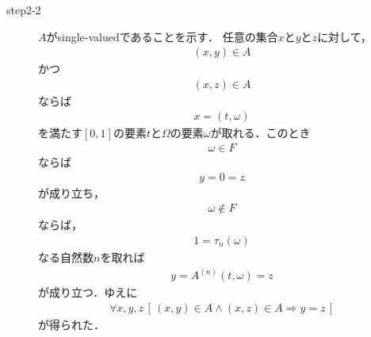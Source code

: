 \begin{sketch}
\begin{description}
			\item[step2-2]
				$A$がsingle-valuedであることを示す．
				任意の集合$x$と$y$と$z$に対して，
				\begin{align}
					(x,y) \in A
				\end{align}
				かつ
				\begin{align}
					(x,z) \in A
				\end{align}
				ならば
				\begin{align}
					x = (t,\omega)
				\end{align}
				を満たす$[0,1]$の要素$t$と$\Omega$の要素$\omega$が取れる．このとき
				\begin{align}
					\omega \in F
				\end{align}
				ならば
				\begin{align}
					y = 0 = z
				\end{align}
				が成り立ち，
				\begin{align}
					\omega \notin F
				\end{align}
				ならば，
				\begin{align}
					1 = \tau_{n}(\omega)
				\end{align}
				なる自然数$n$を取れば
				\begin{align}
					y = A^{(n)}(t,\omega) = z
				\end{align}
				が成り立つ．ゆえに
				\begin{align}
					\forall x,y,z\, \left[\, 
					(x,y) \in A \wedge (x,z) \in A \Longrightarrow y = z\, \right]
				\end{align}
				が得られた．
				

\end{description}
\end{sketch}
